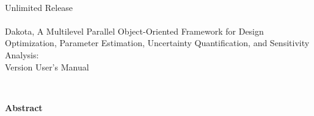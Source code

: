 \documentclass[letterpaper]{book}
\begin{document}
\begin{titlepage}
\setcounter{page}{3}
\begin{center}
{\large \DakotaSANDUsers}\\
{\large Unlimited Release}\\
{\large \DakotaSANDDate}\\

\vspace*{1.5cm}
{\LARGE Dakota, A Multilevel Parallel Object-Oriented Framework for 
Design Optimization, Parameter Estimation, Uncertainty Quantification, 
and Sensitivity Analysis:\\Version \DakotaVersion\space User's Manual}\\
\vspace*{1cm}

\DakotaAuthorUsersSAND
\\ \vspace*{0.5cm}
\DakotaSNLAddress

\newpage

{\Large \bf Abstract}
\end{center}

\DakotaAbstractShared
\DakotaAbstractUsers

\end{titlepage}

\cleardoublepage
\tableofcontents
\cleardoublepage

\setcounter{secnumdepth}{-1} %

\setcounter{secnumdepth}{6} %























\end{document}
